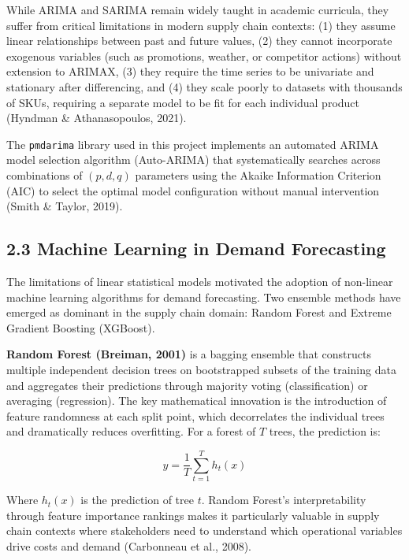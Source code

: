 \documentclass[12pt, a4paper]{report}
\begin{document}
While ARIMA and SARIMA remain widely taught in academic curricula, they suffer from critical limitations in modern supply chain contexts: (1) they assume linear relationships between past and future values, (2) they cannot incorporate exogenous variables (such as promotions, weather, or competitor actions) without extension to ARIMAX, (3) they require the time series to be univariate and stationary after differencing, and (4) they scale poorly to datasets with thousands of SKUs, requiring a separate model to be fit for each individual product (Hyndman \& Athanasopoulos, 2021).

The \texttt{pmdarima} library used in this project implements an automated ARIMA model selection algorithm (Auto-ARIMA) that systematically searches across combinations of $(p, d, q)$ parameters using the Akaike Information Criterion (AIC) to select the optimal model configuration without manual intervention (Smith \& Taylor, 2019).

\subsection{2.3 Machine Learning in Demand Forecasting}

The limitations of linear statistical models motivated the adoption of non-linear machine learning algorithms for demand forecasting. Two ensemble methods have emerged as dominant in the supply chain domain: Random Forest and Extreme Gradient Boosting (XGBoost).

\textbf{Random Forest (Breiman, 2001)} is a bagging ensemble that constructs multiple independent decision trees on bootstrapped subsets of the training data and aggregates their predictions through majority voting (classification) or averaging (regression). The key mathematical innovation is the introduction of feature randomness at each split point, which decorrelates the individual trees and dramatically reduces overfitting. For a forest of $T$ trees, the prediction is:

\begin{equation}
\hat{y} = \frac{1}{T}\sum_{t=1}^{T}h_t(x)
\end{equation}

Where $h_t(x)$ is the prediction of tree $t$. Random Forest's interpretability through feature importance rankings makes it particularly valuable in supply chain contexts where stakeholders need to understand which operational variables drive costs and demand (Carbonneau et al., 2008).
\end{document}
